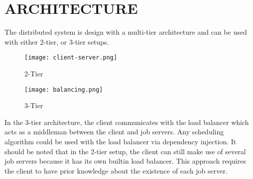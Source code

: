 \section{ARCHITECTURE}\label{sec:architecture}

The distributed system is design with a multi-tier
architecture and can be used with either 2-tier, or 3-tier
setups.

\begin{figure}[H]
    \centering
    \texttt{[image: client-server.png]}
    \caption{2-Tier}
\end{figure}

\begin{figure}[H]
    \centering
    \texttt{[image: balancing.png]}
    \caption{3-Tier}
\end{figure}

In the 3-tier architecture, the client communicates with the load balancer
which acts as a middleman between the client and job servers.
Any scheduling algorithm could be used with the load balancer via
dependency injection.
It should be noted that in the 2-tier setup, the client can still make use
of several job servers because it has its own builtin load balancer.
This approach requires the client to have prior knowledge about
the existence of each job server.
